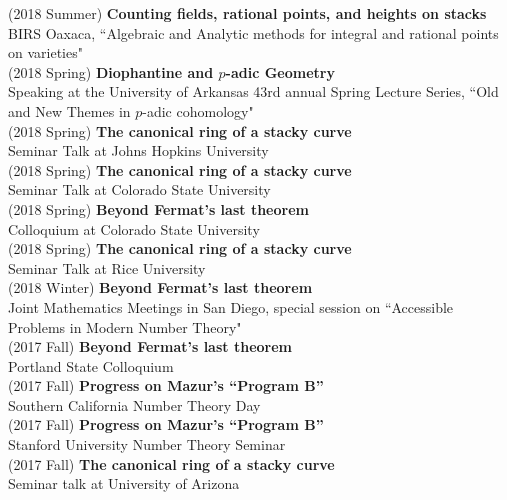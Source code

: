 \documentclass[margin,line]{res}
\begin{document}
\begin{resume}
(2018 Summer) \textbf{Counting fields, rational points, and heights on stacks}\\
BIRS Oaxaca, ``Algebraic and Analytic methods for integral and rational points on varieties"
\vspace{.05cm}\\
(2018 Spring) \textbf{Diophantine and $p$-adic Geometry}\\
Speaking at the University of Arkansas 43rd annual Spring Lecture Series, ``Old and New Themes in $p$-adic cohomology"
\vspace{.05cm}\\
(2018 Spring) \textbf{The canonical ring of a stacky curve}\\  
Seminar Talk at Johns Hopkins University
\\
(2018 Spring) \textbf{The canonical ring of a stacky curve}\\  
Seminar Talk at Colorado State University
\\
(2018 Spring) \textbf{Beyond Fermat's last theorem}\\
Colloquium at Colorado State University 
\vspace{.05cm}\\
(2018 Spring) \textbf{The canonical ring of a stacky curve}\\  
Seminar Talk at Rice University
\vspace{.05cm}\\
(2018 Winter) \textbf{Beyond Fermat's last theorem}\\
Joint Mathematics Meetings in San Diego, special session on ``Accessible Problems in Modern Number Theory" 
\vspace{.05cm}\\
(2017 Fall) \textbf{Beyond Fermat's last theorem}\\
Portland State Colloquium
\vspace{.05cm}\\
(2017 Fall) \textbf{Progress on Mazur's ``Program B''}\\  
Southern California Number Theory Day
\vspace{.05cm}\\
(2017 Fall) \textbf{Progress on Mazur's ``Program B''}\\  
Stanford University Number Theory Seminar
\vspace{.05cm}\\
(2017 Fall) \textbf{The canonical ring of a stacky curve}\\  
Seminar talk at University of Arizona
\vspace{.05cm}\\

\end{resume}
\end{document}
